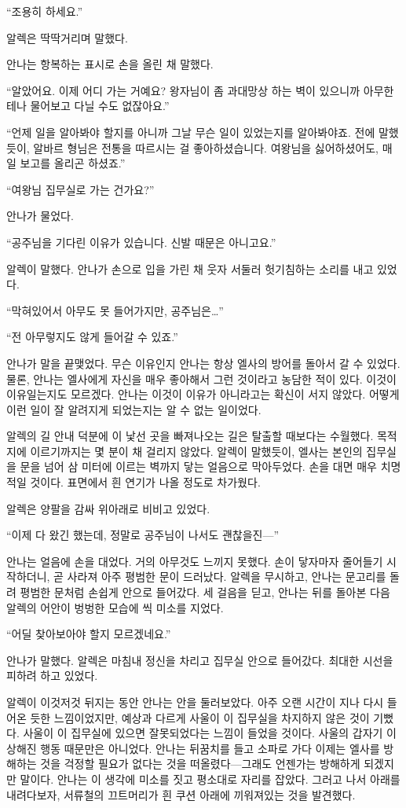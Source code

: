 ``조용히 하세요.''

알렉은 딱딱거리며 말했다.

안나는 항복하는 표시로 손을 올린 채 말했다.

``알았어요. 이제 어디 가는 거예요? 왕자님이 좀 과대망상 하는 벽이 있으니까 아무한테나 물어보고 다닐 수도 없잖아요.''

``언제 일을 알아봐야 할지를 아니까 그날 무슨 일이 있었는지를 알아봐야죠. 전에 말했듯이, 알바르 형님은 전통을 따르시는 걸 좋아하셨습니다. 여왕님을 싫어하셨어도, 매일 보고를 올리곤 하셨죠.''

``여왕님 집무실로 가는 건가요?''

안나가 물었다.

``공주님을 기다린 이유가 있습니다. 신발 때문은 아니고요.''

알렉이 말했다. 안나가 손으로 입을 가린 채 웃자 서둘러 헛기침하는 소리를 내고 있었다.

``막혀있어서 아무도 못 들어가지만, 공주님은\ldots''

``전 아무렇지도 않게 들어갈 수 있죠.''

안나가 말을 끝맺었다. 무슨 이유인지 안나는 항상 엘사의 방어를 돌아서 갈 수 있었다. 물론, 안나는 엘사에게 자신을 매우 좋아해서 그런 것이라고 농담한 적이 있다. 이것이 이유일는지도 모르겠다. 안나는 이것이 이유가 아니라고는 확신이 서지 않았다. 어떻게 이런 일이 잘 알려지게 되었는지는 알 수 없는 일이었다.

알렉의 길 안내 덕분에 이 낯선 곳을 빠져나오는 길은 탈출할 때보다는 수월했다. 목적지에 이르기까지는 몇 분이 채 걸리지 않았다. 알렉이 말했듯이, 엘사는 본인의 집무실을 문을 넘어 삼 미터에 이르는 벽까지 닿는 얼음으로 막아두었다. 손을 대면 매우 치명적일 것이다. 표면에서 흰 연기가 나올 정도로 차가웠다.

알렉은 양팔을 감싸 위아래로 비비고 있었다.

``이제 다 왔긴 했는데, 정말로 공주님이 나서도 괜찮을진—''

안나는 얼음에 손을 대었다. 거의 아무것도 느끼지 못했다. 손이 닿자마자 줄어들기 시작하더니, 곧 사라져 아주 평범한 문이 드러났다. 알렉을 무시하고, 안나는 문고리를 돌려 평범한 문처럼 손쉽게 안으로 들어갔다. 세 걸음을 딛고, 안나는 뒤를 돌아본 다음 알렉의 어안이 벙벙한 모습에 씩 미소를 지었다.

``어딜 찾아보아야 할지 모르겠네요.''

안나가 말했다. 알렉은 마침내 정신을 차리고 집무실 안으로 들어갔다. 최대한 시선을 피하려 하고 있었다.

알렉이 이것저것 뒤지는 동안 안나는 안을 둘러보았다. 아주 오랜 시간이 지나 다시 들어온 듯한 느낌이었지만, 예상과 다르게 사울이 이 집무실을 차지하지 않은 것이 기뻤다. 사울이 이 집무실에 있으면 잘못되었다는 느낌이 들었을 것이다. 사울의 갑자기 이상해진 행동 때문만은 아니었다. 안나는 뒤꿈치를 들고 소파로 가다 이제는 엘사를 방해하는 것을 걱정할 필요가 없다는 것을 떠올렸다—그래도 언젠가는 방해하게 되겠지만 말이다. 안나는 이 생각에 미소를 짓고 평소대로 자리를 잡았다. 그러고 나서 아래를 내려다보자, 서류철의 끄트머리가 흰 쿠션 아래에 끼워져있는 것을 발견했다.

